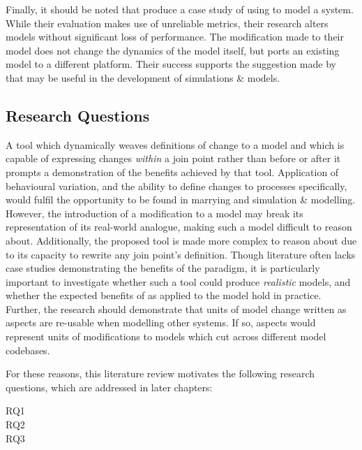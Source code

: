 Finally, it should be noted that \citet{ionescu2009aspect} produce a case study
of using \aop{} to model a system. While their evaluation makes use of
unreliable metrics, their research alters models without significant loss of
performance. The modification made to their model does not change the dynamics
of the model itself, but ports an existing model to a different platform. Their
success supports the suggestion made by \citet{gulyas1999use} that \aop{} may be
useful in the development of simulations \& models. 


\subsection{Research Questions}
\label{subsec:rqs}
\label{rqs}

A tool which dynamically weaves definitions of change to a model and which is
capable of expressing changes \emph{within} a join point rather than before or
after it prompts a demonstration of the benefits achieved by that tool.
Application of behavioural variation, and the ability to define changes to
processes specifically, would fulfil the opportunity to be found in marrying
\aspectorientation{} and simulation \& modelling. However, the introduction of a
modification to a model may break its representation of its real-world analogue,
making such a model difficult to reason about. Additionally, the proposed tool
is made more complex to reason about due to its capacity to rewrite any join
point's definition. Though \aop{} literature often lacks case studies
demonstrating the benefits of the paradigm, it is particularly important to
investigate whether such a tool could produce \emph{realistic} models, and
whether the expected benefits of \aspectorientation{} as applied to the model
hold in practice. Further, the research should demonstrate that units of model
change written as aspects are re-usable when modelling other systems. If so,
aspects would represent units of modifications to models which cut across
different model codebases.

For these reasons, this literature review motivates the following research
questions, which are addressed in later chapters:

\begin{researchquestion}
\begin{description}
  \item[RQ1] \rqone{}
  \item[RQ2] \rqtwo{}
  \item[RQ3] \rqthree{}
\end{description}
\end{researchquestion}

